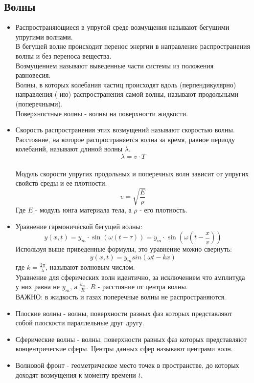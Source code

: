 \documentclass{article}
\begin{document}
\begin{flushleft}
    \section{Волны}
    \begin{itemize}
        \item Распространяющиеся в упругой среде возмущения называют бегущими упругими волнами.
        \\В бегущей волне происходит перенос энергии в направление распространения волны и без переноса вещества.
        \\Возмущением называют выведенные части системы из положения равновесия.
        \\Волны, в которых колебания частиц происходят вдоль (перпендикулярно) направления (-ию) распространения самой волны, называют продольными (поперечными).
        \\Поверхностные волны - волны на поверхности жидкости.
        \item Скорость распространения этих возмущений называют скоростью волны.
        \\Расстояние, на которое распространяется волна за время, равное периоду колебаний, называют длиной волны $\lambda$. \[\lambda = v \cdot T\]
        \\Модуль скорости упругих продольных и поперечных волн зависит от упругих свойств среды и ее плотности. \[v = \sqrt{\frac{E}{\rho}}\]
        Где $E$ - модуль юнга материала тела, а $\rho$ - его плотность.
        \item Уравнение гармонической бегущей волны: \[y(x, t) = y_m \cdot \sin(\omega (t - \tau)) = y_m \cdot \sin(\omega (t - \frac{x}{v}))\]
        Используя выше приведенные формулы, это уравнение можно свернуть:
        \[y(x,t) = y_m sin(\omega t - kx)\]
        где $k = \frac{2\pi}{\lambda}$, называют волновым числом.
        \\Уравнение для сферических волн идентично, за исключением что амплитуда у них равна не $y_m$, а $\frac{y_m}{R}$. $R$ - расстояние от центра волны.
        \\ \textsc{ВАЖНО:} в жидкость и газах поперечные волны не распространяются.
        \item Плоские волны - волны, поверхности разных фаз которых представляют собой плоскости параллельные друг другу.
        \item Сферические волны - волны, поверхности равных фаз которых представляют концентрические сферы. Центры данных сфер называют центрами волн.
        \item Волновой фронт - геометрическое место точек в пространстве, до которых доходят возмущения к моменту времени $t$.

\end{itemize}
\end{flushleft}
\end{document}
